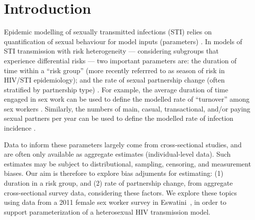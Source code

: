 \section{Introduction}
Epidemic modelling of sexually transmitted infections (STI) relies on
quantification of sexual behaviour for model inputs (parameters) \cite{Garnett2002}.
In models of STI transmission with risk heterogeneity
--- \ie considering subgroups that experience differential risks ---
two important parameters are:
the duration of time within a ``risk group'' (more recently referrred to as season of risk in HIV/STI epidemiology); %
and the rate of sexual partnership change (often stratified by partnership type) %
\cite{Garnett1996,Stigum1997,Watts2010,Knight2020}.
For example, the average duration of time engaged in sex work
can be used to define the modelled rate of ``turnover'' among sex workers \cite{Watts2010}.
Similarly, the numbers of main, casual, transactional, and/or paying sexual partners per year
can be used to define the modelled rate of infection incidence \cite{Boily2015}.
\par
Data to inform these parameters largely come from cross-sectional studies,
and are often only available as aggregate estimates (\vs individual-level data).
Such estimates may be subject to distributional, sampling, censoring, and measurement biases.
Our aim is therefore to explore bias adjuments for estimating: %
(1) duration in a risk group, and (2) rate of partnership change,
from aggregate cross-sectional survey data, considering these factors. %
We explore these topics using data from %
a 2011 female sex worker survey in Eswatini~\cite{Baral2014},
in order to support parameterization of a heterosexual HIV transmission model.
